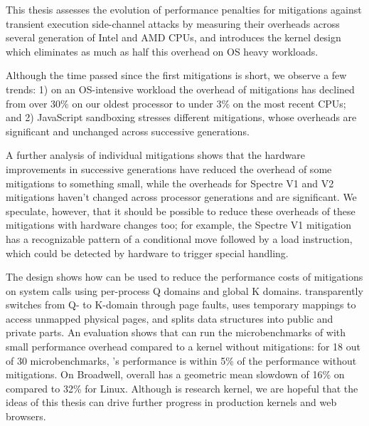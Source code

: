 \label{s:concl}

This thesis assesses the evolution of performance penalties for
mitigations against transient execution side-channel attacks by
measuring their overheads across several generation of Intel and AMD
CPUs, and introduces the \sys kernel design which eliminates as much
as half this overhead on OS heavy workloads.

Although the time passed since the first mitigations is short,
we observe a few trends: 1) on an OS-intensive workload the
overhead of mitigations has declined from over 30\% on our oldest
processor to under 3\% on the most recent CPUs; and 2) JavaScript
sandboxing stresses different mitigations, whose overheads are
significant and unchanged across successive generations.

A further analysis of individual mitigations shows that the hardware
improvements in successive generations have reduced the overhead of
some mitigations to something small, while the overheads for Spectre
V1 and V2 mitigations haven't changed across processor generations and
are significant.  We speculate, however, that it should be possible to
reduce these overheads of these mitigations with hardware changes too;
for example, the Spectre V1 mitigation has a recognizable pattern of a
conditional move followed by a load instruction, which could be
detected by hardware to trigger special handling.

The \sys design
shows how \contract can be used to reduce the performance costs of
mitigations on system calls using per-process Q domains and global K
domains.  \sys transparently switches from Q- to K-domain through page
faults, uses temporary mappings to access unmapped physical pages, and
splits data structures into public and private parts.  An evaluation
shows that \sys can run the microbenchmarks of \bench with small
performance overhead compared to a kernel without mitigations: for
18 out of 30 \bench microbenchmarks, \sys's performance is within 5\%
of the performance without mitigations.
On Broadwell, \sys overall has a geometric mean slowdown of 16\% on \bench compared to 32\% for Linux.
Although \sys is research kernel, we are hopeful that the ideas of this thesis can drive further progress in production kernels and web browsers.
